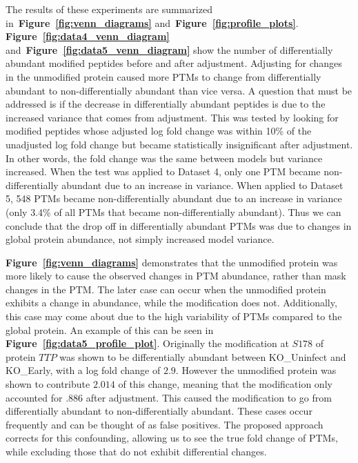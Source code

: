 \documentclass[mcp]{article}
\numberwithin{table}{section}
\def\figref#1{{\bf Figure~\ref{fig:#1}}}
\begin{document}
The results of these experiments are summarized in~\figref{venn_diagrams} and~\figref{profile_plots}. \figref{data4_venn_diagram} and~\figref{data5_venn_diagram} show the number of differentially abundant modified peptides before and after adjustment. Adjusting for changes in the unmodified protein caused more PTMs to change from differentially abundant to non-differentially abundant than vice versa. A question that must be addressed is if the decrease in differentially abundant peptides is due to the increased variance that comes from adjustment. This was tested by looking for modified peptides whose adjusted log fold change was within 10\% of the unadjusted log fold change but became statistically insignificant after adjustment. In other words, the fold change was the same between models but variance increased. When the test was applied to Dataset 4, only one PTM became non-differentially abundant due to an increase in variance. When applied to Dataset 5, 548 PTMs became non-differentially abundant due to an increase in variance (only 3.4\% of all PTMs that became non-differentially abundant). Thus we can conclude that the drop off in differentially abundant PTMs was due to changes in global protein abundance, not simply increased model variance.

\figref{venn_diagrams} demonstrates that the unmodified protein was more likely to cause the observed changes in PTM abundance, rather than mask changes in the PTM. The later case can occur when the unmodified protein exhibits a change in abundance, while the modification does not. Additionally, this case may come about due to the high variability of PTMs compared to the global protein. An example of this can be seen in \figref{data5_profile_plot}. Originally the modification at $S178$ of protein $TTP$ was shown to be differentially abundant between KO\_Uninfect and KO\_Early, with a log fold change of $2.9$. However the unmodified protein was shown to contribute $2.014$ of this change, meaning that the modification only accounted for $.886$ after adjustment. This caused the modification to go from differentially abundant to non-differentially abundant. These cases occur frequently and can be thought of as false positives. The proposed approach corrects for this confounding, allowing us to see the true fold change of PTMs, while excluding those that do not exhibit differential changes.
\end{document}
